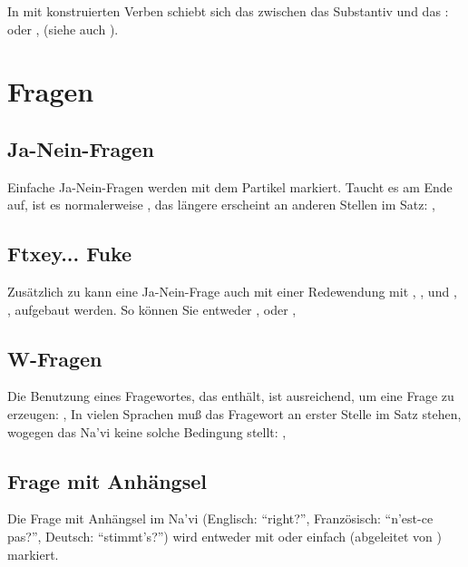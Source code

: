 \subsubsection{} In mit  konstruierten Verben schiebt sich das  zwischen
das Substantiv und das :   oder
,  (siehe auch ).

\section{Fragen}
\subsection{Ja-Nein-Fragen} Einfache Ja-Nein-Fragen werden mit dem Partikel 
markiert. Taucht es am Ende auf, ist es normalerweise , das l\"angere 
erscheint an anderen Stellen im Satz: , 

\subsection{Ftxey... Fuke} Zus\"atzlich zu  kann eine Ja-Nein-Frage auch mit
einer Redewendung mit , , und , ,
aufgebaut werden. So k\"onnen Sie entweder ,  oder
, 
\label{syn:question:ftxey}

\subsection{W-Fragen} Die Benutzung eines Fragewortes, das  enth\"alt, ist
ausreichend, um eine Frage zu erzeugen: , 
In vielen Sprachen mu\ss{} das Fragewort an erster Stelle im Satz stehen, wogegen das
Na’vi keine solche Bedingung stellt: , 

\subsection{Frage mit Anh\"angsel} Die Frage mit Anh\"angsel im Na’vi (Englisch: "`right?"',
Franz\"osisch: "`n’est-ce pas?"', Deutsch: "`stimmt’s?"') wird entweder mit 
oder einfach  (abgeleitet von ) markiert.

